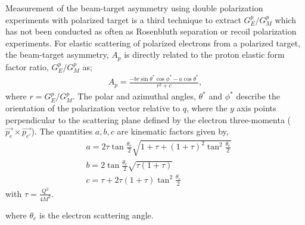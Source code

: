 \documentclass[12pt]{article}
\begin{document}
Measurement of the beam-target asymmetry using double polarization experiments with polarized target is a third technique to extract $G_E^p/G_M^p$ which has not been conducted as often as Rosenbluth separation or recoil polarization experiments. For elastic scattering of polarized electrons from a polarized target, the beam-target asymmetry, $A_p$ is directly related to the proton elastic form factor ratio, $G_E^p/G_M^p$ as;
 \begin{equation}
 \begin{aligned}
\label{btasym}
A_p=\frac{-br\sin \theta^* \cos \phi^*-a\cos \theta^* }{r^2+c},
 \end{aligned}
 \end{equation}
where $r=G_E^p/G_M^p$. The polar and azimuthal angles, $\theta^*$ and $\phi^*$ describe the orientation of the polarization vector relative to $q$, where the $y$ axis points perpendicular to the scattering plane defined by the electron three-momenta ($\vec{p_e} \times \vec{p_{e'}}$). The quantities $a,b,c$ are kinematic factors given by,
 \begin{equation}
 \begin{aligned}
\label{btasymabc}
&a=2 \tau \tan \frac{\theta_e}{2}\sqrt{1+\tau+(1+\tau)^2\tan^2 \frac{\theta_e}{2}}\\
&b=2 \tan \frac{\theta_e}{2}\sqrt{\tau(1+\tau)}\\
&c=\tau+2\tau(1+\tau)\tan^2\frac{\theta_e}{2}
\end{aligned}
\end{equation}
with $\tau=\frac{Q^2}{4M^2}$. 

where $\theta_e$ is the electron scattering angle.
\end{document}
